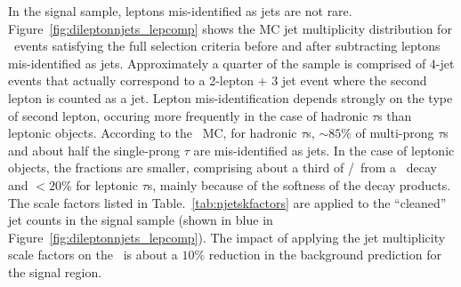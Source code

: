 In the signal sample, leptons mis-identified as jets are not rare. 
Figure~\ref{fig:dileptonnjets_lepcomp}  shows the MC jet
multiplicity distribution for \ttll\ events satisfying the full
selection criteria before and after subtracting leptons mis-identified
as jets. Approximately a quarter of the sample is comprised of 4-jet
events that actually correspond to a 2-lepton + 3 jet event where the second
lepton is counted as a jet. Lepton mis-identification depends strongly
on the type of second lepton, occuring more frequently in the case of
hadronic $\tau$s than leptonic objects. According to the \ttll\
MC, for hadronic $\tau$s, $\sim85\%$ of multi-prong $\tau$s and about half
the single-prong $\tau$ are mis-identified as jets. In the case of
leptonic objects, the fractions are smaller, comprising about a third
of \E/\M\ from a \W\ decay and $<20\%$ for leptonic $\tau$s, 
mainly because of the softness of the decay products. 
The scale factors listed in Table.~\ref{tab:njetskfactors} are applied
to the ``cleaned'' jet counts in the signal sample (shown in blue in
Figure~\ref{fig:dileptonnjets_lepcomp}). The impact of applying the
jet multiplicity scale factors on the \ttll\ is about a $10\%$ reduction in the
background prediction for the signal region. 


